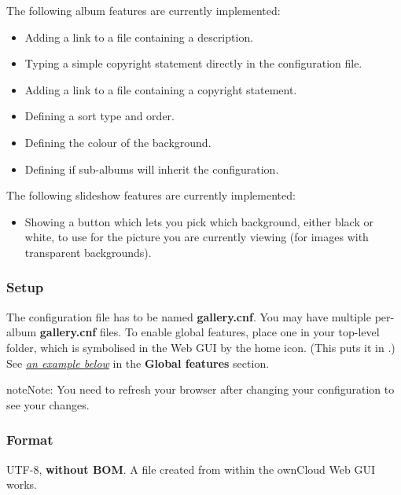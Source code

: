 \documentclass[letterpaper,10pt,english]{sphinxmanual}
\begin{document}
The following album features are currently implemented:
\begin{itemize}
\item {} 
Adding a link to a file containing a description.

\item {} 
Typing a simple copyright statement directly in the configuration file.

\item {} 
Adding a link to a file containing a copyright statement.

\item {} 
Defining a sort type and order.

\item {} 
Defining the colour of the background.

\item {} 
Defining if sub-albums will inherit the configuration.

\end{itemize}

The following slideshow features are currently implemented:
\begin{itemize}
\item {} 
Showing a button which lets you pick which background, either black or
white, to use for the picture you are currently viewing (for images with
transparent backgrounds).

\end{itemize}


\subsubsection{Setup}
\label{files/gallery_app:setup}
The configuration file has to be named \textbf{gallery.cnf}. You may have multiple
per-album \textbf{gallery.cnf} files. To enable global features, place one in your
top-level folder, which is symbolised in the Web GUI by the home icon. (This
puts it in .) See {\hyperref[files/gallery_app:supported\string-variables\string-label]{\emph{an example below}}} in the \textbf{Global features} section.

\begin{notice}{note}{Note:}
You need to refresh your browser after changing your configuration to
see your changes.
\end{notice}


\subsubsection{Format}
\label{files/gallery_app:format}
UTF-8, \textbf{without BOM}. A file created from within the ownCloud Web GUI works.
\end{document}
